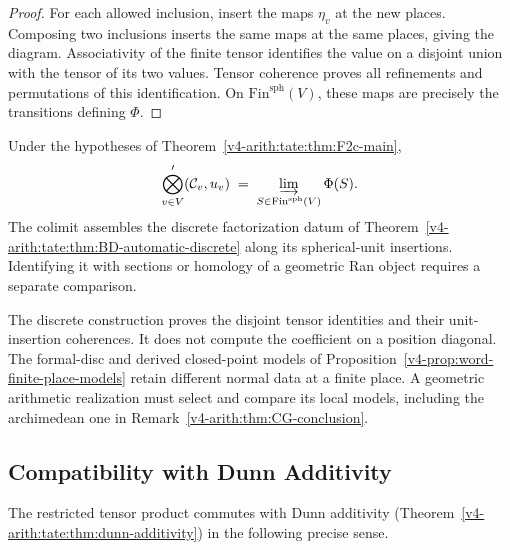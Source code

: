 \begin{proof}
For each allowed inclusion, insert the maps \(\eta_v\) at the
new places. Composing two inclusions inserts the same maps at the
same places, giving the diagram. Associativity of the finite
tensor identifies the value on a disjoint union with the tensor
of its two values. Tensor coherence proves all refinements and
permutations of this identification. On
\(\mathrm{Fin}^{\mathrm{sph}}(V)\), these maps are precisely the
transitions defining \(\Phi\).
\end{proof}

\begin{corollary}
\label{v4-arith:tate:cor:tate-is-factorization-globals}
\ClaimStatusProvedHere Under the hypotheses of
Theorem~\ref{v4-arith:tate:thm:F2c-main},
\[
\bigotimes_{v\in V}^{\prime}(\mathcal{C}_{v},u_{v})\;=\;\varinjlim_{S\in\mathrm{Fin}^{\mathrm{sph}}(V)}\Phi(S).
\]
The colimit assembles the discrete factorization datum of
Theorem~\ref{v4-arith:tate:thm:BD-automatic-discrete} along its
spherical-unit insertions. Identifying it with sections or homology
of a geometric Ran object requires a separate comparison.
\end{corollary}

\begin{remark}
\label{v4-arith:tate:rem:factorization-trivial}
The discrete construction proves the disjoint tensor identities
and their unit-insertion coherences. It does not compute the
coefficient on a position diagonal. The formal-disc and derived
closed-point models of Proposition~\ref{v4-prop:word-finite-place-models}
retain different normal data at a finite place. A geometric
arithmetic realization must select and compare its local models,
including the archimedean one in
Remark~\ref{v4-arith:thm:CG-conclusion}.
\end{remark}

\subsection{Compatibility with Dunn Additivity}
\label{v4-arith:tate:subsec:dunn-compat}

The restricted tensor product commutes with Dunn additivity
(Theorem~\ref{v4-arith:tate:thm:dunn-additivity}) in the following precise sense.

